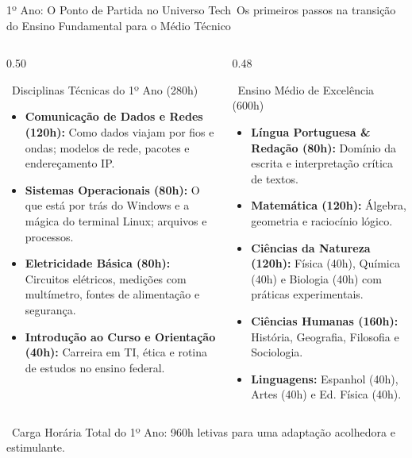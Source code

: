\begin{frame}{1º Ano: O Ponto de Partida no Universo Tech}{\faCompass\ Os primeiros passos na transição do Ensino Fundamental para o Médio Técnico}
  \begin{columns}[t]
    \begin{column}{0.50\textwidth}
      \begin{greencard}{\faMicrochip\ Disciplinas Técnicas do 1º Ano (280h)}
        \tiny
        \begin{itemize}\setlength{\itemsep}{0.15em}
          \item \textbf{Comunicação de Dados e Redes (120h):} Como dados viajam por fios e ondas; modelos de rede, pacotes e endereçamento IP.
          \item \textbf{Sistemas Operacionais (80h):} O que está por trás do Windows e a mágica do terminal Linux; arquivos e processos.
          \item \textbf{Eletricidade Básica (80h):} Circuitos elétricos, medições com multímetro, fontes de alimentação e segurança.
          \item \textbf{Introdução ao Curso e Orientação (40h):} Carreira em TI, ética e rotina de estudos no ensino federal.
        \end{itemize}
      \end{greencard}
    \end{column}
    
    \begin{column}{0.48\textwidth}
      \begin{moderncard}{\faGraduationCap\ Ensino Médio de Excelência (600h)}
        \tiny
        \begin{itemize}\setlength{\itemsep}{0.15em}
          \item \textbf{Língua Portuguesa \& Redação (80h):} Domínio da escrita e interpretação crítica de textos.
          \item \textbf{Matemática (120h):} Álgebra, geometria e raciocínio lógico.
          \item \textbf{Ciências da Natureza (120h):} Física (40h), Química (40h) e Biologia (40h) com práticas experimentais.
          \item \textbf{Ciências Humanas (160h):} História, Geografia, Filosofia e Sociologia.
          \item \textbf{Linguagens:} Espanhol (40h), Artes (40h) e Ed. Física (40h).
        \end{itemize}
      \end{moderncard}
    \end{column}
  \end{columns}
  
  \vspace{0.06cm}
  \begin{center}
    \tiny \textcolor{TechGray}{\faInfoCircle\ Carga Horária Total do 1º Ano: 960h letivas para uma adaptação acolhedora e estimulante.}
  \end{center}
\end{frame}

